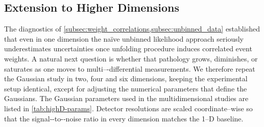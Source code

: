     \subsection{Extension to Higher Dimensions}
    \label{sec:highD_extension}
        The diagnostics of \cref{subsec:weight_correlations,subsec:unbinned_data} established that even in {one} dimension the naïve unbinned likelihood approach
        seriously underestimates uncertainties once unfolding procedure induces correlated event weights.
        A natural next question is whether that pathology grows, diminishes, or saturates as one moves to multi–-differential measurements.
        We therefore repeat the Gaussian study in two, four and six dimensions, keeping the experimental setup identical, except for adjusting the numerical parameters that define the Gaussians.
        The Gaussian parameters used in the multidimensional studies are listed in \cref{tab:highD-params}.
        Detector resolutions are scaled coordinate--wise so that the signal‐-to-‐noise ratio in every dimension matches the 1--D baseline.
